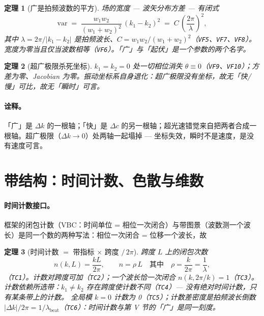 \documentclass[aps,prd,preprint,superscriptaddress,amsmath,amssymb]{revtex4-2}
\newtheorem{theorem}{定理}[section]
\begin{document}
\begin{theorem}[广是拍频波数的平方]
\label{thm:vf8}
场的宽度 --- 波矢分布方差 --- 有闭式
\begin{equation}
\mathrm{var}
\;=\;\frac{w_1w_2}{(w_1+w_2)^2}\,(k_1-k_2)^2
\;=\;C\,\left(\frac{2\pi}{\lambda}\right)^2,
\label{eq:var}
\end{equation}
其中 $\lambda=2\pi/|k_1-k_2|$ 是拍频波长、$C=w_1w_2/(w_1+w_2)^2$（\texttt{VF5}、\texttt{VF7}、\texttt{VF8}）。宽度为零当且仅当波数相等（\texttt{VF6}）。\emph{「广」与「起伏」是一个参数的两个名字。}
\end{theorem}

\begin{theorem}[超广极限杀死坐标]
\label{thm:vf10}
$k_1=k_2=0$ 处一切相位消失 $\theta\equiv0$（\texttt{VF9}、\texttt{VF10}）；方差为零、Jacobian 为零。振动坐标系自身退化：超广极限没有坐标，故无「快/慢」可比，故无「瞬时」可言。
\end{theorem}

\paragraph{诠释。}
「广」是 $\Delta k$ 的一根轴；「快」是 $\Delta c$ 的另一根轴；超光速错觉来自把两者合成一根轴。超广极限（$\Delta k\to0$）处两轴一起塌掉 --- 坐标失效，瞬时不是速度，是没有速度可言。

\section{带结构：时间计数、色散与维数}
\label{sec:bands}

\paragraph{时间计数接口。}
框架的闭包计数（VBC：时间单位 = 相位一次闭合）与带图景（波数测一个波长）是同一个数的两种写法：相位一次闭合 = 位移一个波长，故

\begin{theorem}[时间计数 $=$ 带指标 $\times$ 跨度 $/\,2\pi$]
\label{thm:tc}
跨度 $L$ 上的闭包次数
\begin{equation}
n(k,L)=\frac{kL}{2\pi},
\qquad
n=\rho\,L\quad\text{其中}\quad \rho=\frac{k}{2\pi}=\frac1\lambda,
\label{eq:ntc}
\end{equation}
（\texttt{TC1}）。计数对跨度可加（\texttt{TC2}）；一个波长恰一次闭合 $n(k,2\pi/k)=1$（\texttt{TC3}）。计数依赖所选带：$k_1\ne k_2$ 存在跨度使计数不同（\texttt{TC4}）--- \emph{没有绝对时间计数，只有某条带上的计数。} 全局模 $k=0$ 计数为 0（\texttt{TC5}）；计数差密度是拍频波长倒数 $|\Delta k|/2\pi=1/\lambda_{\mathrm{beat}}$（\texttt{TC6}）：时间计数与第 V 节的「广」是同一刻度。
\end{theorem}
\end{document}
